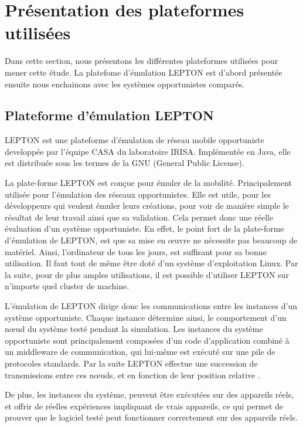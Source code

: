 \documentclass[a4paper,10pt]{article}
\begin{document}
\section{Présentation des plateformes utilisées}
Dans cette section, nous présentons les différentes plateformes utilisées pour mener cette étude. La platefome d'émulation LEPTON est d'abord présentée ensuite nous enchainons avec les systèmes opportunistes comparés.

\subsection{Plateforme d'émulation LEPTON}
LEPTON est une plateforme d'émulation  de réseau mobile opportuniste developpée par l'équipe CASA du laboratoire IRISA. Implémentée en Java, elle est distribuée sous les termes de la GNU (General Public License). \par

La plate-forme LEPTON est conçue pour émuler de la mobilité. Principalement utilisée pour l’émulation des réseaux opportunistes. Elle est utile, pour les développeurs qui veulent émuler leurs créations, pour voir de manière simple le résultat de leur travail ainsi que sa validation. Cela permet donc une réelle évaluation d’un système opportuniste. En effet, le point fort de la plate-forme d’émulation de LEPTON, est que sa mise en œuvre ne nécessite pas beaucoup de matériel. Ainsi, l’ordinateur de tous les jours, est suffisant pour sa bonne utilisation. \cite{casa} Il faut tout de même  être doté d’un système d’exploitation Linux.  Par la suite, pour de plus amples utilisations, il est possible d’utiliser LEPTON sur n’importe quel cluster de machine.\par

L’émulation de LEPTON dirige donc les communications entre les instances d’un système opportuniste. Chaque instance détermine ainsi, le comportement d'un nœud du système testé pendant la simulation. Les instances du système opportuniste sont principalement composées d'un code d'application combiné à un middleware de communication, qui lui-même est exécuté sur une pile de protocoles standards. Par la suite LEPTON effectue une succession de transmissions entre ces nœuds, et en fonction de leur position relative \cite{lepton18}.\par

De plus, les instances du système, peuvent être exécutées sur des appareils réels, et offrir de réelles expériences impliquant de vrais appareils, ce qui permet de prouver que le logiciel testé peut fonctionner correctement sur des appareils réels.
\end{document}
